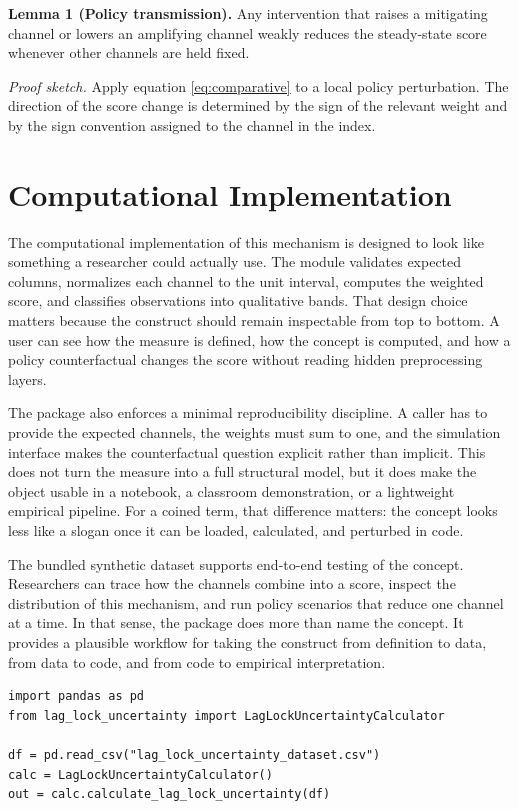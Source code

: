 \documentclass[12pt]{article}
\begin{document}
\textbf{Lemma 1 (Policy transmission).} Any intervention that raises a mitigating channel or lowers an amplifying channel weakly reduces the steady-state score whenever other channels are held fixed.

\textit{Proof sketch.} Apply equation \eqref{eq:comparative} to a local policy perturbation. The direction of the score change is determined by the sign of the relevant weight and by the sign convention assigned to the channel in the index.

\section{Computational Implementation}
The computational implementation of this mechanism is designed to look like something a researcher could actually use. The module validates expected columns, normalizes each channel to the unit interval, computes the weighted score, and classifies observations into qualitative bands. That design choice matters because the construct should remain inspectable from top to bottom. A user can see how the measure is defined, how the concept is computed, and how a policy counterfactual changes the score without reading hidden preprocessing layers.

The package also enforces a minimal reproducibility discipline. A caller has to provide the expected channels, the weights must sum to one, and the simulation interface makes the counterfactual question explicit rather than implicit. This does not turn the measure into a full structural model, but it does make the object usable in a notebook, a classroom demonstration, or a lightweight empirical pipeline. For a coined term, that difference matters: the concept looks less like a slogan once it can be loaded, calculated, and perturbed in code.

The bundled synthetic dataset supports end-to-end testing of the concept. Researchers can trace how the channels combine into a score, inspect the distribution of this mechanism, and run policy scenarios that reduce one channel at a time. In that sense, the package does more than name the concept. It provides a plausible workflow for taking the construct from definition to data, from data to code, and from code to empirical interpretation.

\begin{verbatim}
import pandas as pd
from lag_lock_uncertainty import LagLockUncertaintyCalculator

df = pd.read_csv("lag_lock_uncertainty_dataset.csv")
calc = LagLockUncertaintyCalculator()
out = calc.calculate_lag_lock_uncertainty(df)
\end{verbatim}
\end{document}
